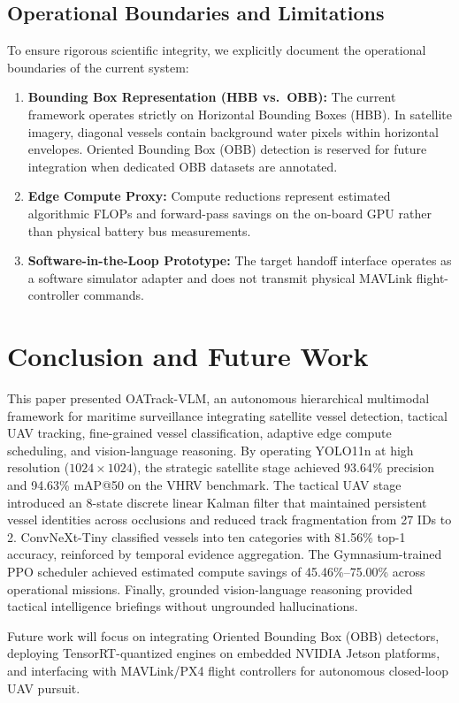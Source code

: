 \documentclass[conference]{IEEEtran}
\begin{document}
\subsection{Operational Boundaries and Limitations}
To ensure rigorous scientific integrity, we explicitly document the operational boundaries of the current system:
\begin{enumerate}
    \item \textbf{Bounding Box Representation (HBB vs.\ OBB):} The current framework operates strictly on Horizontal Bounding Boxes (HBB). In satellite imagery, diagonal vessels contain background water pixels within horizontal envelopes. Oriented Bounding Box (OBB) detection is reserved for future integration when dedicated OBB datasets are annotated.
    \item \textbf{Edge Compute Proxy:} Compute reductions represent estimated algorithmic FLOPs and forward-pass savings on the on-board GPU rather than physical battery bus measurements.
    \item \textbf{Software-in-the-Loop Prototype:} The target handoff interface operates as a software simulator adapter and does not transmit physical MAVLink flight-controller commands.
\end{enumerate}

\section{Conclusion and Future Work}
This paper presented OATrack-VLM, an autonomous hierarchical multimodal framework for maritime surveillance integrating satellite vessel detection, tactical UAV tracking, fine-grained vessel classification, adaptive edge compute scheduling, and vision-language reasoning. By operating YOLO11n at high resolution ($1024\times1024$), the strategic satellite stage achieved 93.64\% precision and 94.63\% mAP@50 on the VHRV benchmark. The tactical UAV stage introduced an 8-state discrete linear Kalman filter that maintained persistent vessel identities across occlusions and reduced track fragmentation from 27 IDs to 2. ConvNeXt-Tiny classified vessels into ten categories with 81.56\% top-1 accuracy, reinforced by temporal evidence aggregation. The Gymnasium-trained PPO scheduler achieved estimated compute savings of 45.46\%--75.00\% across operational missions. Finally, grounded vision-language reasoning provided tactical intelligence briefings without ungrounded hallucinations.

Future work will focus on integrating Oriented Bounding Box (OBB) detectors, deploying TensorRT-quantized engines on embedded NVIDIA Jetson platforms, and interfacing with MAVLink/PX4 flight controllers for autonomous closed-loop UAV pursuit.



\end{document}
